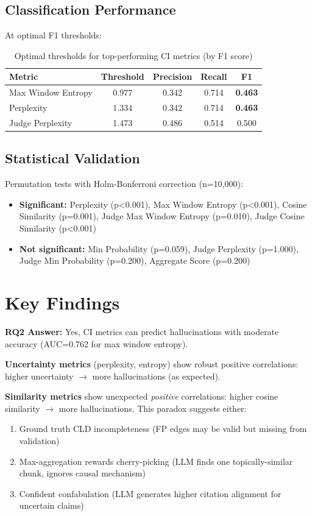 \subsection{Classification Performance}

At optimal F1 thresholds:

\begin{table}[h]
\centering
\small
\begin{tabular}{lcccc}
\toprule
\textbf{Metric} & \textbf{Threshold} & \textbf{Precision} & \textbf{Recall} & \textbf{F1} \\
\midrule
Max Window Entropy & 0.977 & 0.342 & 0.714 & \textbf{0.463} \\
Perplexity & 1.334 & 0.342 & 0.714 & \textbf{0.463} \\
Judge Perplexity & 1.473 & 0.486 & 0.514 & 0.500 \\
\bottomrule
\end{tabular}
\caption{Optimal thresholds for top-performing CI metrics (by F1 score)}
\label{tab:rq2_thresholds}
\end{table}

\subsection{Statistical Validation}

Permutation tests with Holm-Bonferroni correction (n=10,000):
\begin{itemize}
    \item \textbf{Significant:} Perplexity (p<0.001), Max Window Entropy (p<0.001), Cosine Similarity (p=0.001), Judge Max Window Entropy (p=0.010), Judge Cosine Similarity (p<0.001)
    \item \textbf{Not significant:} Min Probability (p=0.059), Judge Perplexity (p=1.000), Judge Min Probability (p=0.200), Aggregate Score (p=0.200)
\end{itemize}

\section{Key Findings}

\textbf{RQ2 Answer:} Yes, CI metrics can predict hallucinations with moderate accuracy (AUC=0.762 for max window entropy).

\textbf{Uncertainty metrics} (perplexity, entropy) show robust positive correlations: higher uncertainty $\rightarrow$ more hallucinations (as expected).

\textbf{Similarity metrics} show unexpected \textit{positive} correlations: higher cosine similarity $\rightarrow$ more hallucinations. This paradox suggests either:
\begin{enumerate}
    \item Ground truth CLD incompleteness (FP edges may be valid but missing from validation)
    \item Max-aggregation rewards cherry-picking (LLM finds one topically-similar chunk, ignores causal mechanism)
    \item Confident confabulation (LLM generates higher citation alignment for uncertain claims)
\end{enumerate}

